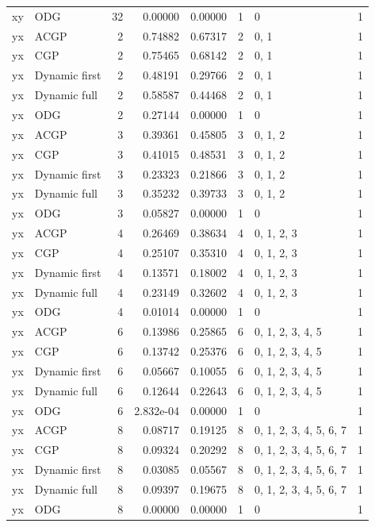 \documentclass[10pt,a4paper]{article}
\begin{document}
\begin{longtable}{@{}p{23mm}p{29mm}rrrrp{36mm}r@{}}
xy & ODG & 32 & 0.00000 & 0.00000 & 1 & 0 & 1 \\
yx & ACGP & 2 & 0.74882 & 0.67317 & 2 & 0, 1 & 1 \\
yx & CGP & 2 & 0.75465 & 0.68142 & 2 & 0, 1 & 1 \\
yx & Dynamic first & 2 & 0.48191 & 0.29766 & 2 & 0, 1 & 1 \\
yx & Dynamic full & 2 & 0.58587 & 0.44468 & 2 & 0, 1 & 1 \\
yx & ODG & 2 & 0.27144 & 0.00000 & 1 & 0 & 1 \\
yx & ACGP & 3 & 0.39361 & 0.45805 & 3 & 0, 1, 2 & 1 \\
yx & CGP & 3 & 0.41015 & 0.48531 & 3 & 0, 1, 2 & 1 \\
yx & Dynamic first & 3 & 0.23323 & 0.21866 & 3 & 0, 1, 2 & 1 \\
yx & Dynamic full & 3 & 0.35232 & 0.39733 & 3 & 0, 1, 2 & 1 \\
yx & ODG & 3 & 0.05827 & 0.00000 & 1 & 0 & 1 \\
yx & ACGP & 4 & 0.26469 & 0.38634 & 4 & 0, 1, 2, 3 & 1 \\
yx & CGP & 4 & 0.25107 & 0.35310 & 4 & 0, 1, 2, 3 & 1 \\
yx & Dynamic first & 4 & 0.13571 & 0.18002 & 4 & 0, 1, 2, 3 & 1 \\
yx & Dynamic full & 4 & 0.23149 & 0.32602 & 4 & 0, 1, 2, 3 & 1 \\
yx & ODG & 4 & 0.01014 & 0.00000 & 1 & 0 & 1 \\
yx & ACGP & 6 & 0.13986 & 0.25865 & 6 & 0, 1, 2, 3, 4, 5 & 1 \\
yx & CGP & 6 & 0.13742 & 0.25376 & 6 & 0, 1, 2, 3, 4, 5 & 1 \\
yx & Dynamic first & 6 & 0.05667 & 0.10055 & 6 & 0, 1, 2, 3, 4, 5 & 1 \\
yx & Dynamic full & 6 & 0.12644 & 0.22643 & 6 & 0, 1, 2, 3, 4, 5 & 1 \\
yx & ODG & 6 & 2.832e-04 & 0.00000 & 1 & 0 & 1 \\
yx & ACGP & 8 & 0.08717 & 0.19125 & 8 & 0, 1, 2, 3, 4, 5, 6, 7 & 1 \\
yx & CGP & 8 & 0.09324 & 0.20292 & 8 & 0, 1, 2, 3, 4, 5, 6, 7 & 1 \\
yx & Dynamic first & 8 & 0.03085 & 0.05567 & 8 & 0, 1, 2, 3, 4, 5, 6, 7 & 1 \\
yx & Dynamic full & 8 & 0.09397 & 0.19675 & 8 & 0, 1, 2, 3, 4, 5, 6, 7 & 1 \\
yx & ODG & 8 & 0.00000 & 0.00000 & 1 & 0 & 1 \\

\end{longtable}
\end{document}
